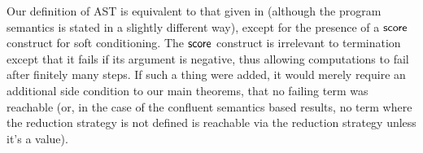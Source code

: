
\begin{remark}
\label{rem:score}
Our definition of AST is equivalent to that given in \cite{MakOPW21} (although the program semantics is stated in a slightly different way), except for the presence of a $\tscore$ construct for soft conditioning. 
The $\tscore$ construct is irrelevant to termination except that it fails if its argument is negative, thus allowing computations to fail after finitely many steps. 
If such a thing were added, it would merely require an additional side condition to our main theorems, that no failing term was reachable (or, in the case of the confluent semantics based results, no term where the reduction strategy is not defined is reachable via the reduction strategy unless it's a value).
\end{remark}

\iffalse
\lo{Your operational semantics does not maintain a record of the current weight of the reduction.
A.s.~termination does depend on $\tscore$: see \cite[\S 4.3]{MakOPW21}\footnote{\url{https://arxiv.org/abs/2004.03924}}.
I think it important to take the behaviour of $\tscore$ into account;
you should do it as a future task.}
\fi
